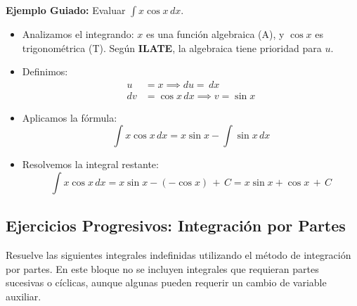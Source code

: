 \documentclass[12pt, letterpaper]{article}
\newcommand{\dx}{\,dx}
\newcommand{\CC}{\,+\,C}
\begin{document}
\noindent\textbf{Ejemplo Guiado:} Evaluar $\int x \cos x \dx$.
\begin{itemize}
  \item Analizamos el integrando: $x$ es una función algebraica (A), y $\cos x$ es trigonométrica (T). Según \textbf{ILATE}, la algebraica tiene prioridad para $u$.
  \item Definimos:
    \begin{align*}
      u &= x \implies du = \dx \\
      dv &= \cos x \dx \implies v = \sin x
    \end{align*}
  \item Aplicamos la fórmula:
    $$\int x\cos x\dx = x\sin x - \int \sin x \dx$$
  \item Resolvemos la integral restante:
    $$\int x\cos x\dx = x\sin x - (-\cos x) \CC = x\sin x + \cos x \CC$$
\end{itemize}

\newpage

\subsection{Ejercicios Progresivos: Integración por Partes}
Resuelve las siguientes integrales indefinidas utilizando el método de integración por partes. En este bloque no se incluyen integrales que requieran partes sucesivas o cíclicas, aunque algunas pueden requerir un cambio de variable auxiliar.
\end{document}
